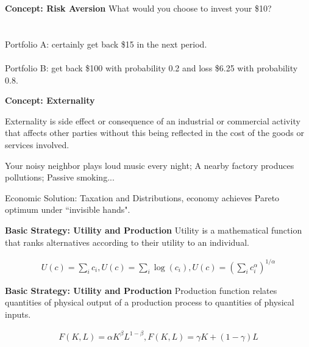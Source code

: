 \documentclass{beamer}
\begin{document}
\begin{frame}{\bf Concept: Risk Aversion}
What would you choose to invest your \$10?
~\\
~\\
~\\
Portfolio A: certainly get back \$15 in the next period.
~\\
~\\
Portfolio B: get back \$100 with probability 0.2 and loss \$6.25 with probability 0.8.
\end{frame}

\begin{frame}{\bf Concept: Externality}
\begin{definition}
	Externality is side effect or consequence of an industrial or commercial activity that affects other parties without this being reflected in the cost of the goods or services involved.
\end{definition}
\begin{example}
Your noisy neighbor plays loud music every night; A nearby factory produces pollutions; Passive smoking...
\end{example}
Economic Solution: Taxation and Distributions, economy achieves Pareto optimum under ``invisible hands".
\end{frame}

\begin{frame}{\bf Basic Strategy: Utility and Production}
Utility is a mathematical function that ranks alternatives according to their utility to an individual.
\begin{example}
\begin{align*}
U(c)=\sum_i c_i, U(c)=\sum_i \log(c_i), U(c)=(\sum_ic_i^{\alpha})^{1/\alpha}
\end{align*}

\end{example}
\end{frame}

\begin{frame}{\bf Basic Strategy: Utility and Production}
Production function relates quantities of physical output of a production process to quantities of physical inputs.
\begin{example}
	\begin{align*}
F(K,L)=\alpha K^{\beta}L^{1-\beta}, F(K,L)=\gamma K+(1-\gamma)L
	\end{align*}
\end{example}
\end{frame}
\end{document}
